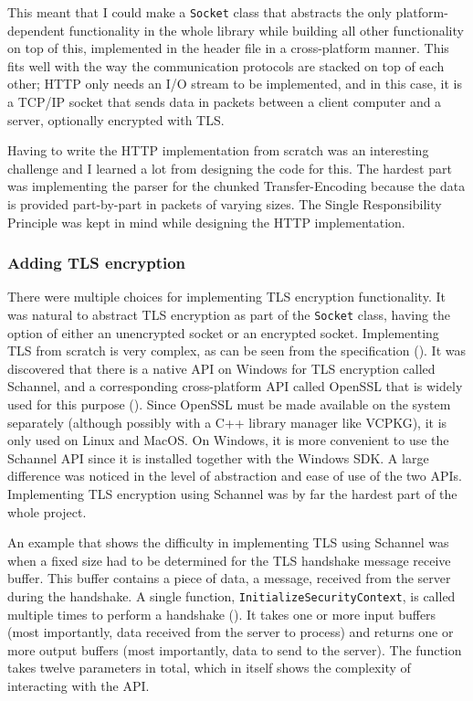 \documentclass[12pt, a4paper]{article}
\begin{document}
This meant that I could make a \texttt{Socket} class that abstracts the only platform-dependent functionality in the whole library while building all other functionality on top of this, implemented in the header file in a cross-platform manner. This fits well with the way the communication protocols are stacked on top of each other; HTTP only needs an I/O stream to be implemented, and in this case, it is a TCP/IP socket that sends data in packets between a client computer and a server, optionally encrypted with TLS. 

Having to write the HTTP implementation from scratch was an interesting challenge and I learned a lot from designing the code for this. The hardest part was implementing the parser for the chunked Transfer-Encoding because the data is provided part-by-part in packets of varying sizes. The Single Responsibility Principle was kept in mind while designing the HTTP implementation.
\subsubsection{Adding TLS encryption}
There were multiple choices for implementing TLS encryption functionality. It was natural to abstract TLS encryption as part of the \texttt{Socket} class, having the option of either an unencrypted socket or an encrypted socket. Implementing TLS from scratch is very complex, as can be seen from the specification (\cite{TlsSpec}). It was discovered that there is a native API on Windows for TLS encryption called Schannel, and a corresponding cross-platform API called OpenSSL that is widely used for this purpose (\cite{OpenSSL}). Since OpenSSL must be made available on the system separately (although possibly with a C++ library manager like VCPKG), it is only used on Linux and MacOS. On Windows, it is more convenient to use the Schannel API since it is installed together with the Windows SDK. A large difference was noticed in the level of abstraction and ease of use of the two APIs. Implementing TLS encryption using Schannel was by far the hardest part of the whole project. 

An example that shows the difficulty in implementing TLS using Schannel was when a fixed size had to be determined for the TLS handshake message receive buffer. This buffer contains a piece of data, a message, received from the server during the handshake. A single function, \texttt{InitializeSecurityContext}, is called multiple times to perform a handshake (\cite{MicrosoftInitializeSecurityContext}). It takes one or more input buffers (most importantly, data received from the server to process) and returns one or more output buffers (most importantly, data to send to the server). The function takes twelve parameters in total, which in itself shows the complexity of interacting with the API.
\end{document}
